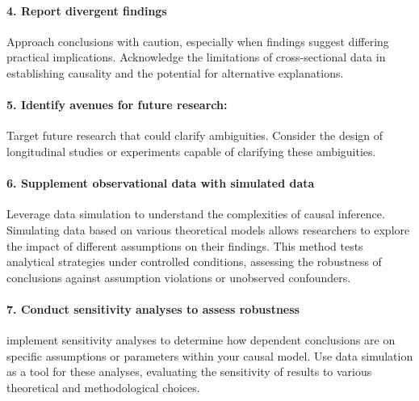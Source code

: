 \documentclass[
  singlecolumn]{article}
\let\oldparagraph\paragraph
\renewcommand{\paragraph}[1]{\oldparagraph{#1}\mbox{}}
\begin{document}
\paragraph{\texorpdfstring{4. \textbf{Report divergent
findings}}{4. Report divergent findings}}\label{report-divergent-findings}

Approach conclusions with caution, especially when findings suggest
differing practical implications. Acknowledge the limitations of
cross-sectional data in establishing causality and the potential for
alternative explanations.

\paragraph{\texorpdfstring{5. \textbf{Identify avenues for future
research}:}{5. Identify avenues for future research:}}\label{identify-avenues-for-future-research}

Target future research that could clarify ambiguities. Consider the
design of longitudinal studies or experiments capable of clarifying
these ambiguities.

\paragraph{\texorpdfstring{6. \textbf{Supplement observational data with
simulated
data}}{6. Supplement observational data with simulated data}}\label{supplement-observational-data-with-simulated-data}

Leverage data simulation to understand the complexities of causal
inference. Simulating data based on various theoretical models allows
researchers to explore the impact of different assumptions on their
findings. This method tests analytical strategies under controlled
conditions, assessing the robustness of conclusions against assumption
violations or unobserved confounders.

\paragraph{\texorpdfstring{7. \textbf{Conduct sensitivity analyses to
assess
robustness}}{7. Conduct sensitivity analyses to assess robustness}}\label{conduct-sensitivity-analyses-to-assess-robustness}

implement sensitivity analyses to determine how dependent conclusions
are on specific assumptions or parameters within your causal model. Use
data simulation as a tool for these analyses, evaluating the sensitivity
of results to various theoretical and methodological choices.
\end{document}
